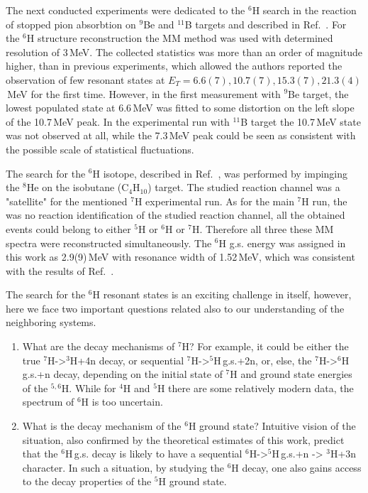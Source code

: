 The next conducted experiments were dedicated to the $^{6}$H search in the reaction of stopped pion absorbtion on $^{9}$Be and $^{11}$B targets and described in Ref.\ \cite{Gurov:2007}.
For the $^{6}$H structure reconstruction the MM method was used with determined resolution of 3\,MeV.
The collected statistics was more than an order of magnitude higher, than in previous experiments, which allowed the authors reported the observation of few resonant states at $E_T = {6.6(7), 10.7(7), 15.3(7), 21.3(4)}$\,MeV for the first time.
However, in the first measurement with $^{9}$Be target, the lowest populated state at 6.6\,MeV was fitted to some distortion on the left slope of the 10.7\,MeV peak.
In the experimental run with $^{11}$B target the 10.7\,MeV state was not observed at all, while the 7.3\,MeV peak could be seen as consistent with the possible scale of statistical fluctuations.

The search for the $^{6}$H isotope, described in Ref.\ \cite{Caamano:2008}, was performed by impinging the $^{8}$He on the isobutane (C$_{4}$H$_{10}$) target.
The studied reaction channel was a "satellite" for the mentioned $^{7}$H experimental run.
As for the main $^{7}$H run, the was no reaction identification of the studied reaction channel, all the obtained events could belong to either $^{5}$H or $^{6}$H or $^{7}$H.
Therefore all three these MM spectra were reconstructed simultaneously.
The $^{6}$H g.s. energy was assigned in this work as 2.9(9)\,MeV with resonance width of 1.52\,MeV, which was consistent with the results of Ref.\ \cite{Aleksandrov:1984,Belozyorov:1986}. 


The search for the $^{6}$H resonant states is an exciting challenge in itself, however, here we face two important questions related also to our understanding of the neighboring systems.

\renewcommand{\labelenumi}{\roman{enumi}}
\begin{enumerate}
	\item 
	What are the decay mechanisms of $^{7}$H? 
	For example, it could be either the true $^{7}$H->$^{3}$H+4n decay, or sequential $^{7}$H->$^{5}$H\,g.s.+2n, or, else, the $^{7}$H->$^{6}$H\,g.s.+n decay, depending on the initial state of $^{7}$H and ground state energies of the $^{5,6}$H. 
	While for $^{4}$H and $^{5}$H there are some relatively modern data, the spectrum of $^{6}$H is too uncertain.
	\item 
	What is the decay mechanism of the $^{6}$H ground state?
	Intuitive vision of the situation, also confirmed by the theoretical estimates of this work, predict that the $^{6}$H\,g.s. decay is likely to have a sequential $^{6}$H->$^{5}$H\,g.s.+n -> $^{3}$H+3n character. 
	In such a situation, by studying the $^{6}$H decay, one also gains access to the decay properties of the $^{5}$H ground state.
\end{enumerate}

